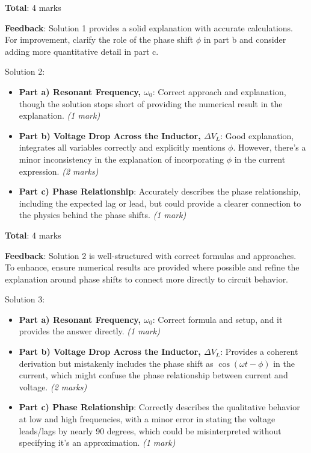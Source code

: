 \documentclass[a4paper,11pt]{article}
\begin{document}
\textbf{Total}: 4 marks

\textbf{Feedback}: Solution 1 provides a solid explanation with accurate calculations. For improvement, clarify the role of the phase shift \( \phi \) in part b and consider adding more quantitative detail in part c.

Solution 2:

\begin{itemize}
    \item \textbf{Part a) Resonant Frequency, \( \omega_{0} \)}: Correct approach and explanation, though the solution stops short of providing the numerical result in the explanation. \textit{(1 mark)}
    \item \textbf{Part b) Voltage Drop Across the Inductor, \( \Delta V_{L} \)}: Good explanation, integrates all variables correctly and explicitly mentions \( \phi \). However, there's a minor inconsistency in the explanation of incorporating \( \phi \) in the current expression. \textit{(2 marks)}
    \item \textbf{Part c) Phase Relationship}: Accurately describes the phase relationship, including the expected lag or lead, but could provide a clearer connection to the physics behind the phase shifts. \textit{(1 mark)}
\end{itemize}

\textbf{Total}: 4 marks

\textbf{Feedback}: Solution 2 is well-structured with correct formulas and approaches. To enhance, ensure numerical results are provided where possible and refine the explanation around phase shifts to connect more directly to circuit behavior.

Solution 3:

\begin{itemize}
    \item \textbf{Part a) Resonant Frequency, \( \omega_{0} \)}: Correct formula and setup, and it provides the answer directly. \textit{(1 mark)}
    \item \textbf{Part b) Voltage Drop Across the Inductor, \( \Delta V_{L} \)}: Provides a coherent derivation but mistakenly includes the phase shift as \( \cos(\omega t - \phi) \) in the current, which might confuse the phase relationship between current and voltage. \textit{(2 marks)}
    \item \textbf{Part c) Phase Relationship}: Correctly describes the qualitative behavior at low and high frequencies, with a minor error in stating the voltage leads/lags by nearly 90 degrees, which could be misinterpreted without specifying it's an approximation. \textit{(1 mark)}
\end{itemize}
\end{document}
